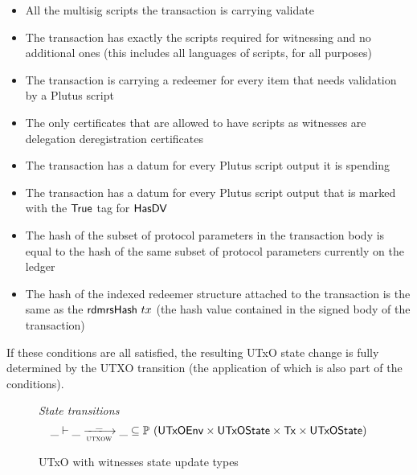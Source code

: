 \begin{itemize}

    \item All the multisig scripts the transaction is carrying validate

    \item The transaction has exactly the scripts required for witnessing and no
    additional ones (this includes all languages of scripts, for all purposes)

    \item The transaction is carrying a redeemer for every item that needs
    validation by a Plutus script

    \item The only certificates that are allowed to have scripts as witnesses
    are delegation deregistration certificates

    \item The transaction has a datum for every Plutus script output it is spending

    \item The transaction has a datum for every Plutus script output that is
    marked with the $\mathsf{True}$ tag for $\mathsf{HasDV}$

    \item
    The hash of the subset of protocol parameters in the transaction body is equal to
    the hash of the same subset of protocol parameters currently on the ledger

    \item The hash of the indexed redeemer structure attached to the transaction is
    the same as the $\mathsf{rdmrsHash}~{tx}$ (the hash value contained in the signed body of
    the transaction)

\end{itemize}

If these conditions are all satisfied, the resulting UTxO state change is fully determined
by the UTXO transition (the application of which is also part of the conditions).

\begin{figure}[htb]
  \emph{State transitions}
  \begin{equation*}
    \_ \vdash
    \var{\_} \trans{utxow}{\_} \var{\_}
    \subseteq \powerset (\UTxOEnv \times \UTxOState \times \Tx \times \UTxOState)
  \end{equation*}
  \caption{UTxO with witnesses state update types}
  \label{fig:ts-types:utxo-scripts}
\end{figure}


